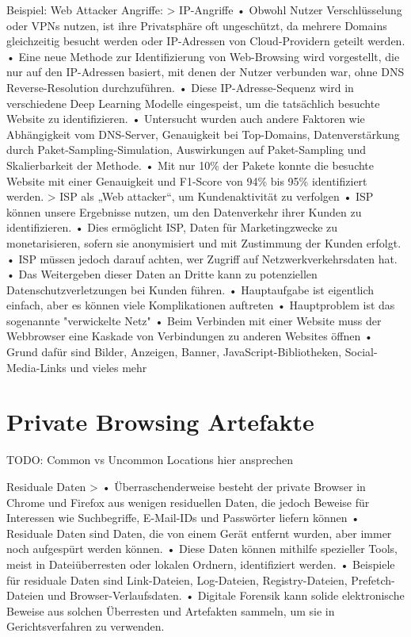 Beispiel: Web Attacker Angriffe:
	> IP-Angriffe \cite{Perdices.2023}
		•	Obwohl Nutzer Verschlüsselung oder VPNs nutzen, ist ihre Privatsphäre oft ungeschützt, da mehrere Domains gleichzeitig besucht werden oder IP-Adressen von Cloud-Providern geteilt werden.
		•	Eine neue Methode zur Identifizierung von Web-Browsing wird vorgestellt, die nur auf den IP-Adressen basiert, mit denen der Nutzer verbunden war, ohne DNS Reverse-Resolution durchzuführen.
		•	Diese IP-Adresse-Sequenz wird in verschiedene Deep Learning Modelle eingespeist, um die tatsächlich besuchte Website zu identifizieren.
		•	Untersucht wurden auch andere Faktoren wie Abhängigkeit vom DNS-Server, Genauigkeit bei Top-Domains, Datenverstärkung durch Paket-Sampling-Simulation, Auswirkungen auf Paket-Sampling und Skalierbarkeit der Methode.
		•	Mit nur 10\% der Pakete konnte die besuchte Website mit einer Genauigkeit und F1-Score von 94\% bis 95\% identifiziert werden.
	> ISP als „Web attacker“, um Kundenaktivität zu verfolgen \cite{Aggarwal.2010}
		•	ISP können unsere Ergebnisse nutzen, um den Datenverkehr ihrer Kunden zu identifizieren.
		•	Dies ermöglicht ISP, Daten für Marketingzwecke zu monetarisieren, sofern sie anonymisiert und mit Zustimmung der Kunden erfolgt.
		•	ISP müssen jedoch darauf achten, wer Zugriff auf Netzwerkverkehrsdaten hat.
		•	Das Weitergeben dieser Daten an Dritte kann zu potenziellen Datenschutzverletzungen bei Kunden führen.
		•	Hauptaufgabe ist eigentlich einfach, aber es können viele Komplikationen auftreten
		•	Hauptproblem ist das sogenannte "verwickelte Netz"
		•	Beim Verbinden mit einer Website muss der Webbrowser eine Kaskade von Verbindungen zu anderen Websites öffnen
		•	Grund dafür sind Bilder, Anzeigen, Banner, JavaScript-Bibliotheken, Social-Media-Links und vieles mehr
		
		






\section{Private Browsing Artefakte}

TODO: Common vs Uncommon Locations hier ansprechen

Residuale Daten 
	> \cite{Izzati.2022}
		•	Überraschenderweise besteht der private Browser in Chrome und Firefox aus wenigen residuellen Daten, die jedoch Beweise für Interessen wie Suchbegriffe, E-Mail-IDs und Passwörter liefern können
		•	Residuale Daten sind Daten, die von einem Gerät entfernt wurden, aber immer noch aufgespürt werden können.
		•	Diese Daten können mithilfe spezieller Tools, meist in Dateiüberresten oder lokalen Ordnern, identifiziert werden.
		•	Beispiele für residuale Daten sind Link-Dateien, Log-Dateien, Registry-Dateien, Prefetch-Dateien und Browser-Verlaufsdaten.
		•	Digitale Forensik kann solide elektronische Beweise aus solchen Überresten und Artefakten sammeln, um sie in Gerichtsverfahren zu verwenden.
		
